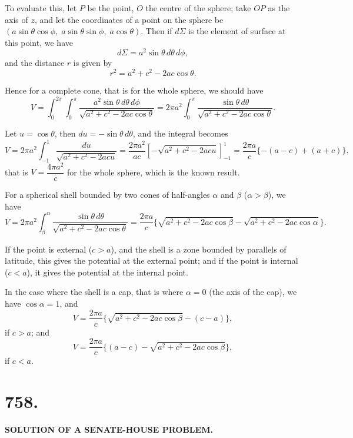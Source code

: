 \documentclass[12pt,a4paper]{article}
\begin{document}
To evaluate this, let $P$ be the point, $O$ the centre of the sphere; take
$OP$ as the axis of $z$, and let the coordinates of a point on the sphere be
$(a\sin\theta\cos\phi,\; a\sin\theta\sin\phi,\; a\cos\theta)$.
Then if $d\Sigma$ is the element of surface at this point, we have
%
\[
d\Sigma = a^2 \sin\theta \, d\theta \, d\phi,
\]
%
and the distance $r$ is given by
%
\[
r^2 = a^2 + c^2 - 2ac\cos\theta.
\]

Hence for a complete cone, that is for the whole sphere, we should have
%
\[
V = \int_0^{2\pi} \!\! \int_0^{\pi}
\frac{a^2 \sin\theta \, d\theta \, d\phi}{\sqrt{a^2 + c^2 - 2ac\cos\theta}}
= 2\pi a^2 \int_0^{\pi} \frac{\sin\theta \, d\theta}{\sqrt{a^2 + c^2 - 2ac\cos\theta}}.
\]

Let $u = \cos\theta$, then $du = -\sin\theta \, d\theta$, and the integral becomes
%
\[
V = 2\pi a^2 \int_{-1}^{1} \frac{du}{\sqrt{a^2 + c^2 - 2acu}}
= \frac{2\pi a^2}{ac} \left[ -\sqrt{a^2 + c^2 - 2acu} \right]_{-1}^{1}
= \frac{2\pi a}{c} \{ -(a-c) + (a+c) \},
\]
%
that is $V = \dfrac{4\pi a^2}{c}$ for the whole sphere, which is the known result.

For a spherical shell bounded by two cones of half-angles $\alpha$ and $\beta$
($\alpha > \beta$), we have
%
\[
V = 2\pi a^2 \int_{\beta}^{\alpha}
\frac{\sin\theta \, d\theta}{\sqrt{a^2 + c^2 - 2ac\cos\theta}}
= \frac{2\pi a}{c} \{ \sqrt{a^2 + c^2 - 2ac\cos\beta}
- \sqrt{a^2 + c^2 - 2ac\cos\alpha} \}.
\]

If the point is external ($c > a$), and the shell is a zone bounded by
parallels of latitude, this gives the potential at the external point; and if
the point is internal ($c < a$), it gives the potential at the internal point.

In the case where the shell is a cap, that is where $\alpha = 0$ (the axis of
the cap), we have $\cos\alpha = 1$, and
%
\[
V = \frac{2\pi a}{c} \{ \sqrt{a^2 + c^2 - 2ac\cos\beta} - (c-a) \},
\]
if $c > a$; and
%
\[
V = \frac{2\pi a}{c} \{ (a-c) - \sqrt{a^2 + c^2 - 2ac\cos\beta} \},
\]
if $c < a$.

\newpage


\section*{758.}

\begin{center}
\textbf{SOLUTION OF A SENATE-HOUSE PROBLEM.}
\end{center}
\end{document}
